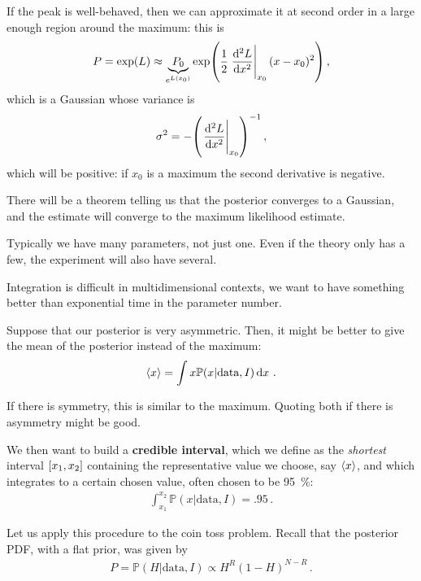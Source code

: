 \documentclass[main.tex]{subfiles}
\begin{document}
If the peak is well-behaved, then we can approximate it at second order in a large enough region around the maximum: this is 
%
\begin{align}
P = \exp(L) \approx \underbrace{P_0}_{e^{L(x_0 )}}
\exp( \frac{1}{2} \eval{\dv[2]{L}{x}}_{x_0 } (x- x_0 )^2) 
\,,
\end{align}
%
which is a Gaussian whose variance is 
%
\begin{align}
\sigma^2 = - \qty(\eval{\dv[2]{L}{x}}_{x_0 })^{-1}
\,,
\end{align}
%
which will be positive: if \(x_0 \) is a maximum the second derivative is negative. 


There will be a theorem telling us that the posterior converges to a Gaussian, and the estimate will converge to the maximum likelihood estimate. 

Typically we have many parameters, not just one. Even if the theory only has a few, the experiment will also have several. 

Integration is difficult in multidimensional contexts, we want to have something better than exponential time in the parameter number. 

Suppose that our posterior is very asymmetric. Then, it might be better to give the mean of the posterior instead of the maximum: 
%
\begin{align}
\expval{x} = \int x \mathbb{P}(x | \text{data}, I) \dd{x}
\,.
\end{align}

If there is symmetry, this is similar to the maximum. Quoting both if there is asymmetry might be good. 

We then want to build a \textbf{credible interval}, which we define as the \emph{shortest} interval \(\qty[x_1, x_2 ]\) containing the representative value we choose, say \(\expval{x}\), and which integrates to a certain chosen value, often chosen to be \SI{95}{\percent}: 
%
\begin{align}
\int_{x_1 }^{x_2 } \mathbb{P}(x | \text{data}, I) = \num{.95}
\,.
\end{align}

Let us apply this procedure to the coin toss problem. Recall that the posterior PDF, with a flat prior, was given by 
%
\begin{align}
P = \mathbb{P}(H | \text{data}, I) \propto H^{R} (1- H)^{N-R}
\,.
\end{align}
\end{document}
